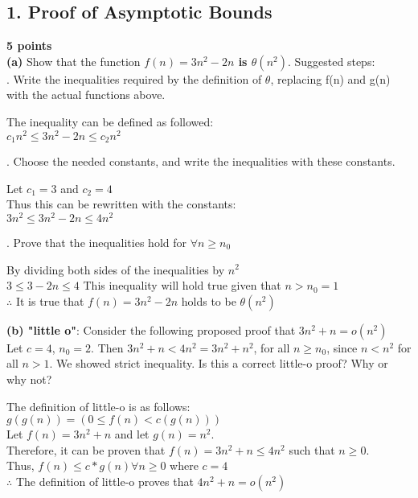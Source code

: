 \documentclass[12pt]{article}
\begin{document}
\subsection*{1. Proof of Asymptotic Bounds}
\textbf{5 points} \\
\textbf{(a)} Show that the function \textbf{$f(n)=3n^2-2n$ is $\theta(n^2)$}. Suggested steps: \\
\linebreak
{}.  Write the inequalities required by the definition of $\theta$, replacing f(n) and g(n) with the actual functions above. \\
\linebreak
\begin{center}
The inequality can be defined as followed: \\
$c_1n^2 \leqslant 3n^2 - 2n \leqslant c_2n^2$ 
\end{center}
\linebreak
{}. Choose the needed constants, and write the inequalities with these constants. 
\begin{center}
Let $c_1 = 3$ and $c_2 = 4$ \\
Thus this can be rewritten with the constants: \\
$3n^2 \leqslant 3n^2 - 2n \leqslant 4n^2$ 
\end{center}
. Prove that the inequalities hold for $\forall n \geqslant n_0$ 
\begin{center}
By dividing both sides of the inequalities by $n^2$ \\
$3 \leqslant 3 - 2n \leqslant 4$
This inequality will hold true given that $n > n_0 = 1$ \\
$\therefore$ It is true that $f(n) = 3n^2 - 2n$ holds to be $\theta(n^2)$
\end{center}
\linebreak
\textbf{(b) "little o"}: Consider the following proposed proof that $3n^2+n=o(n^2)$\\
\quad Let $c=4$, $n_0 = 2$.
\quad Then $3n^2 + n < 4n^2 = 3n^2 + n^2$, for all $n \geqslant n_0$, since $n < n^2$ for all $n > 1$. We showed strict inequality. Is this a correct little-o proof? Why or why not? \\
\begin{center}
The definition of little-o is as follows: \\
$g(g(n)) = {(0 \leqslant f(n) < c(g(n)))}$ \\
Let $f(n) = 3n^2 + n$ and let $g(n) = n^2$. \\
Therefore,  it can be proven that $f(n) = 3n^2 + n \leqslant 4n^2$ such that $n \geqslant 0$. \\
Thus, $f(n) \leqslant c * g(n) \forall n \geqslant 0$  where $c = 4$ \\
$\therefore$ The definition of little-o proves that $4n^2 + n = o(n^2)$ \\
\end{center}
\linebreak
\end{document}
